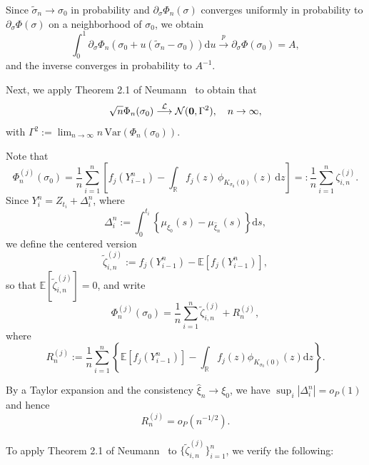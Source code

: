 \documentclass[a4paper,10pt,twoside]{article}
\numberwithin{equation}{section}
\def\dis{\displaystyle}
\def\l{\left}
\def\r{\right}
\def\s{\sigma}
\def\toP{\stackrel{p}{\longrightarrow}}
\def\toD{\stackrel{{\cal L}}{\longrightarrow}}
\def\E{\mathbb{E}}
\def\mb#1{\mbox{\boldmath $#1$}}
\def\wt#1{\widetilde{#1}}
\begin{document}
Since $\wt{\s}_n \to \sigma_0$ in probability and $\partial_\sigma \Phi_n(\sigma)$ converges uniformly in probability to $\partial_\sigma \Phi(\sigma)$ on a neighborhood of $\sigma_0$, we obtain
\[
\int_0^1 \partial_\sigma \Phi_n\l( \sigma_0 + u (\wt{\s}_n - \sigma_0) \r) \mathrm{d}u 
\toP \partial_\sigma \Phi(\sigma_0) = A,
\]
and the inverse converges in probability to $A^{-1}$.

Next, we apply Theorem 2.1 of Neumann~\cite{n13} to obtain that 
\[
\sqrt{n} \Phi_n(\sigma_0) \toD \mathcal{N}(\mb{0}, \Gamma^2),\quad n\to \infty, 
\]
with  $\dis \Gamma^2 := \lim_{n \to \infty} n \, \mathrm{Var}\l( \Phi_n(\sigma_0) \r).$

Note that
\[
\Phi_n^{(j)}(\sigma_0) = \frac{1}{n} \sum_{i=1}^n \l[ f_j(Y_{i-1}^n) 
- \int_{\mathbb{R}} f_j(z) \, \phi_{K_{\sigma_0}(0)}(z) \, \mathrm{d}z \r]
=: \frac{1}{n} \sum_{i=1}^n\zeta_{i,n}^{(j)}.
\]
Since $Y_i^n = Z_{t_i} + \Delta_i^n$, where 
\[
\Delta_i^n := \int_0^{t_i} \l\{ \mu_{\xi_0}(s) - \mu_{\widehat{\xi}_n}(s) \r\} \mathrm{d}s,
\]
we define the centered version
\[
\widetilde{\zeta}_{i,n}^{(j)} := f_j(Y_{i-1}^n) - \E[f_j(Y_{i-1}^n)],
\]
so that $\E[\widetilde{\zeta}_{i,n}^{(j)} ] = 0$, and write
\[
\Phi_n^{(j)}(\sigma_0)
= \frac{1}{n} \sum_{i=1}^n \widetilde{\zeta}_{i,n}^{(j)} + R_n^{(j)},
\]
where
\[
R_n^{(j)} := \frac{1}{n} \sum_{i=1}^n \l\{ \E[f_j(Y_{i-1}^n)] - \int_{\mathbb{R}} f_j(z) \phi_{K_{\sigma_0}(0)}(z) \mathrm{d}z \r\}.
\]

By a Taylor expansion and the consistency $\widehat{\xi}_n \to \xi_0$, we have $\sup_i |\Delta_i^n| = o_P(1)$ and hence
\[
R_n^{(j)} = o_P(n^{-1/2}).
\]

To apply Theorem 2.1 of Neumann~\cite{n13} to $\{ \widetilde{\zeta}_{i,n}^{(j)} \}_{i=1}^n$, we verify the following:
\end{document}

